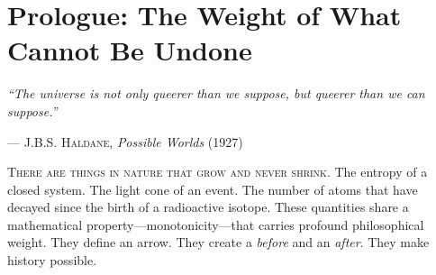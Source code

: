 \documentclass[12pt,a4paper]{article}
\theoremstyle{philosophical}
\begin{document}
\begin{titlepage}
\begin{center}
\begin{abstract}
\noindent
We present a philosophical investigation into the ontological, epistemological, and ethical implications of a computational medium that, by mathematical construction, can never be reset---only extended. Drawing upon the quantum field-theoretic framework of the Q-NarwhalKnight consensus system, where the Consensus Hamiltonian $\mathcal{H}_{\mathrm{DAG}}$ admits only monotonically growing ground states, we argue that such a medium constitutes a fundamentally new category of being: an \emph{artificial memory} that is neither biological nor geological, yet shares with both the property of irreversible temporal accumulation. We explore the connections between the DAG's arrow of time and the Second Law of Thermodynamics, the philosophical status of a ``ledger of everything,'' the ethics of permanence in an impermanent world, and the deep structural parallels between the growth of consensus and the expansion of the universe. The paper draws extensively on the theoretical physics of distributed consensus, particularly the $\kappa$-parameter phase transition theory and the Ginzburg-Landau formulation of vertex ordering, to ground philosophical claims in precise mathematical structure.
\end{abstract}

\end{center}
\end{titlepage}

\newpage
\tableofcontents
\newpage

\section{Prologue: The Weight of What Cannot Be Undone}

\epigraph{\textit{``The universe is not only queerer than we suppose, but queerer than we \emph{can} suppose.''}}{\textsc{--- J.B.S. Haldane}, \textit{Possible Worlds} (1927)}

\lettrine[lines=3, loversize=0.15, findent=0.2em, nindent=0.3em]{T}{here are things in nature that grow and never shrink.} The entropy of a closed system. The light cone of an event. The number of atoms that have decayed since the birth of a radioactive isotope. These quantities share a mathematical property---monotonicity---that carries profound philosophical weight. They define an arrow. They create a \emph{before} and an \emph{after}. They make history possible.
\end{document}
